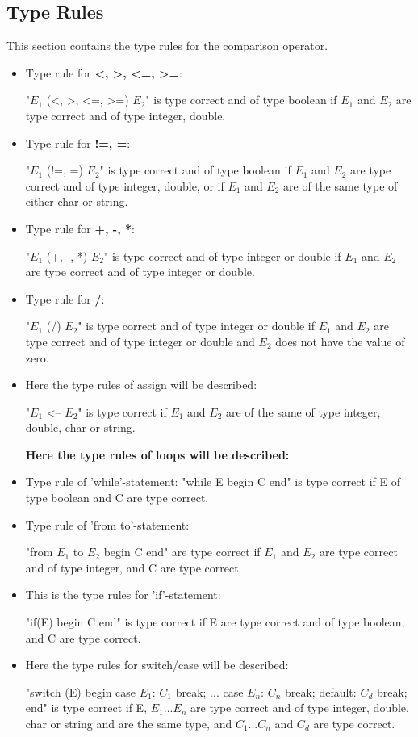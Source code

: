 \subsection{Type Rules} %
This section contains the type rules for the comparison operator.
\begin{itemize}

\item Type rule for \textbf{<, >, <=, >=}:

"$E_1$ (<, >, <=, >=) $E_2$" is type correct and of type boolean if $E_1$ and $E_2$ are type correct and of type integer, double.

\item Type rule for \textbf{!=, =}:

"$E_1$ (!=, =) $E_2$" is type correct and of type boolean if $E_1$ and $E_2$ are type correct and of type integer, double, or if $E_1$ and $E_2$ are of the same type of either char or string.

\item Type rule for \textbf{+, -, *}:

"$E_1$ (+, -, *) $E_2$" is type correct and of type integer or double if $E_1$ and $E_2$ are type correct and of type integer or double.

\item Type rule for \textbf{/}:

"$E_1$ (/) $E_2$" is type correct and of type integer or double if $E_1$ and $E_2$ are type correct and of type integer or double and $E_2$ does not have the value of zero.

\item Here the type rules of assign will be described:

"$E_1$ <-- $E_2$" is type correct if $E_1$ and $E_2$ are of the same of type integer, double, char or string.

\textbf{Here the type rules of loops will be described:}

\item Type rule of 'while'-statement: 
"while E begin C end" is type correct if E of type boolean and C are type correct.

\item Type rule of 'from to'-statement: 

"from $E_1$ to $E_2$ begin C end" are type correct if $E_1$ and $E_2$ are type correct and of type integer, and C are type correct.

\item This is the type rules for 'if'-statement:

"if(E) begin C end" is type correct if E are type correct and of type boolean, and C are type correct.

\item Here the type rules for switch/case will be described:

"switch (E) begin case $E_1$: $C_1$ break; ... case $E_n$: $C_n$ break; default: $C_d$ break; end" is type correct if E, $E_1$...$E_n$ are type correct and of type integer, double, char or string and are the same type, and $C_1$...$C_n$ and $C_d$ are type correct.
\end{itemize}